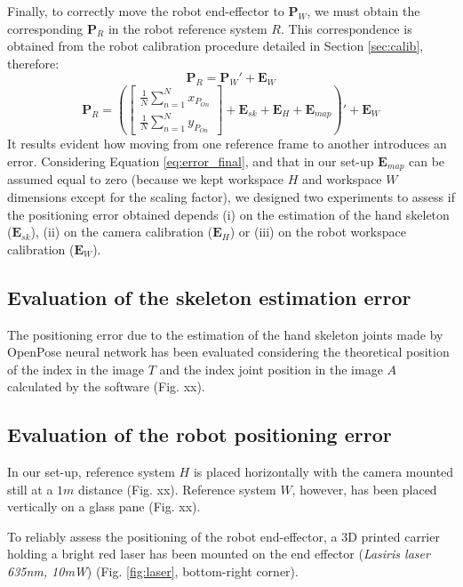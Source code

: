 \documentclass[letterpaper, 10 pt, conference]{ieeeconf}  %
\begin{document}
Finally, to correctly move the robot end-effector to $\mathbf{P}_W$, we must obtain the corresponding $\mathbf{P}_R$ in the robot reference system $R$. This correspondence is obtained from the robot calibration procedure detailed in Section \ref{sec:calib}, therefore: 
\begin{equation}
\mathbf{P}_R = \mathbf{P}_W' + \mathbf{E}_W
\end{equation}
\begin{equation}\label{eq:error_final}
\mathbf{P}_R = \left(\begin{bmatrix}
\frac{1}{N}\sum_{n=1}^{N}x_{P_{On}} \\
\frac{1}{N}\sum_{n=1}^{N}y_{P_{On}}
\end{bmatrix} + \mathbf{E}_{sk} + \mathbf{E}_{H} + \mathbf{E}_{map} \right)' + \mathbf{E}_W
\end{equation}
It results evident how moving from one reference frame to another introduces an error. Considering Equation \ref{eq:error_final}, and that in our set-up $\mathbf{E}_{map}$ can be assumed equal to zero (because we kept workspace $H$ and workspace $W$ dimensions except for the scaling factor), we designed two experiments to assess if the positioning error obtained depends (i) on the estimation of the hand skeleton ($\mathbf{E}_{sk}$), (ii) on the camera calibration ($\mathbf{E}_{H}$) or (iii) on the robot workspace calibration ($\mathbf{E}_{W}$).

\subsection{Evaluation of the skeleton estimation error}
The positioning error due to the estimation of the hand skeleton joints made by OpenPose neural network has been evaluated considering the theoretical position of the index in the image $T$ and the index joint position in the image $A$ calculated by the software (Fig. xx).

\subsection{Evaluation of the robot positioning error}
In our set-up, reference system $H$ is placed horizontally with the camera mounted still at a $1 m$ distance (Fig. xx). Reference system $W$, however, has been placed vertically on a glass pane (Fig. xx). %

To reliably assess the positioning of the robot end-effector, a 3D printed carrier holding a bright red laser has been mounted on the end effector (\textit{Lasiris laser 635nm, 10mW}) (Fig. \ref{fig:laser}, bottom-right corner).
\end{document}
